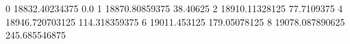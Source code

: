 0 18832.40234375 0.0
1 18870.80859375 38.40625
2 18910.11328125 77.7109375
4 18946.720703125 114.318359375
6 19011.453125 179.05078125
8 19078.087890625 245.685546875
